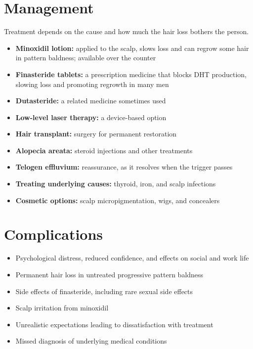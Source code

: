 \section*{Management}
Treatment depends on the cause and how much the hair loss bothers the person.

\begin{itemize}
    \item \textbf{Minoxidil lotion:} applied to the scalp, slows loss and can regrow some hair in pattern baldness; available over the counter
    \item \textbf{Finasteride tablets:} a prescription medicine that blocks DHT production, slowing loss and promoting regrowth in many men
    \item \textbf{Dutasteride:} a related medicine sometimes used
    \item \textbf{Low-level laser therapy:} a device-based option
    \item \textbf{Hair transplant:} surgery for permanent restoration
    \item \textbf{Alopecia areata:} steroid injections and other treatments
    \item \textbf{Telogen effluvium:} reassurance, as it resolves when the trigger passes
    \item \textbf{Treating underlying causes:} thyroid, iron, and scalp infections
    \item \textbf{Cosmetic options:} scalp micropigmentation, wigs, and concealers
\end{itemize}

\section*{Complications}
\begin{itemize}
    \item Psychological distress, reduced confidence, and effects on social and work life
    \item Permanent hair loss in untreated progressive pattern baldness
    \item Side effects of finasteride, including rare sexual side effects
    \item Scalp irritation from minoxidil
    \item Unrealistic expectations leading to dissatisfaction with treatment
    \item Missed diagnosis of underlying medical conditions
\end{itemize}

